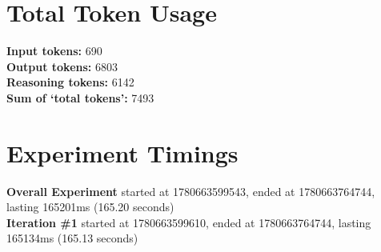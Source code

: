 \documentclass{article}
\begin{document}
\section*{Total Token Usage}
\textbf{Input tokens: }690
\\\textbf{Output tokens: }6803
\\\textbf{Reasoning tokens: }6142
\\\textbf{Sum of `total tokens': }7493
\section*{Experiment Timings}
\textbf{Overall Experiment} started at 1780663599543, ended at 1780663764744, lasting 165201ms (165.20 seconds)
\\\textbf{Iteration \#1} started at 1780663599610, ended at 1780663764744, lasting 165134ms (165.13 seconds)
\end{document}
